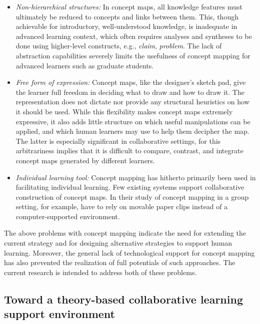 \begin{itemize}
\item {\it Non-hierarchical structures:\/} In concept maps, all knowledge
  features must ultimately be reduced to concepts and links between them.
  This, though achievable for introductory, well-understood knowledge, is
  inadequate in advanced learning context, which often requires analyses
  and syntheses to be done using higher-level constructs, e.g., {\it
  claim\/}, {\it problem\/}. The lack of abstraction capabilities
  severely limits the usefulness of concept mapping for advanced learners
  such as graduate students.
  
\item {\it Free form of expression:\/} Concept maps, like the designer's
  sketch pad, give the learner full freedom in deciding what to draw and
  how to draw it. The representation does not dictate nor provide any
  structural heuristics on how it should be used. While this flexibility
  makes concept maps extremely expressive, it also adds little structure
  on which useful manipulations can be applied, and which human learners
  may use to help them decipher the map. The latter is especially
  significant in collaborative settings, for this arbitrariness implies
  that it is difficult to compare, contrast, and integrate concept maps
  generated by different learners.
  
\item {\it Individual learning tool:\/} Concept mapping has hitherto
  primarily been used in facilitating individual learning. Few existing
  systems support collaborative construction of concept maps. In their
  study of concept mapping in a group setting, for example, \cite{Roth92}
  have to rely on movable paper clips instead of a computer-supported
  environment.
\end{itemize}

The above problems with concept mapping indicate the need for extending the
current strategy and for designing alternative strategies to support human
learning. Moreover, the general lack of technological support for concept
mapping has also prevented the realization of full potentials of such
approaches. The current research is intended to address both of these
problems.


\subsection{Toward a theory-based collaborative learning support environment}

